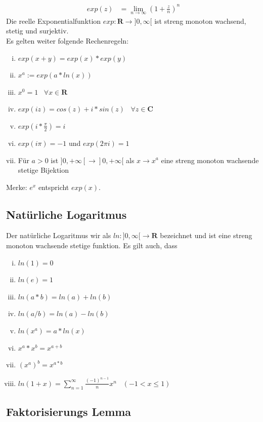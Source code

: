 \documentclass[8pt]{extarticle}
\begin{document}
\begin{multicols*}{3}
\begin{align*}
  exp(z) &= \lim_{n \rightarrow \infty} (1 + \frac{z}{n})^n
\end{align*}
Die reelle Exponentialfunktion $exp: \mathbf{R} \rightarrow ]0, \infty[$ ist streng monoton wachsend,
stetig und surjektiv.\\
Es gelten weiter folgende Rechenregeln:
\begin{enumerate}[(i)]
  \item $exp(x + y) = exp(x) * exp(y)$
  \item $x^a := exp(a * ln(x))$
  \item $x^0 = 1 \;\;\; \forall x \in \mathbf{R}$
  \item $exp(iz) = cos(z) + i*sin(z) \;\;\; \forall z \in \mathbf{C}$
  \item $exp(i*\frac{\pi}{2}) = i$
  \item $exp(i\pi) = -1$ und $exp(2\pi i) = 1$
  \item Für $a > 0$ ist $]0, +\infty[ \rightarrow ]0, +\infty[$ als $x \rightarrow x^a$ eine
  streng monoton wachsende stetige Bijektion
\end{enumerate}
Merke: $e^x$ entspricht $exp(x)$.

\subsection{Natürliche Logaritmus}

Der natürliche Logaritmus wir als $ln: ]0, \infty[ \rightarrow \mathbf{R}$ bezeichnet
und ist eine streng monoton wachsende stetige funktion. Es gilt auch, dass
\begin{enumerate}[(i)]
  \item $ln(1) = 0$
  \item $ln(e) = 1$
  \item $ln(a * b) = ln(a) + ln(b)$
  \item $ln(a / b) = ln(a) - ln(b)$
  \item $ln(x^a) = a * ln(x)$
  \item $x^a * x^b = x^{a + b}$
  \item $(x^a)^b = x^{a * b}$
  \item $ln(1+x) = \sum_{n=1}^{\infty} \frac{(-1)^{n-1}}{n} x^n \;\;\; (-1 < x \leq 1)$
\end{enumerate}

\subsection{Faktorisierungs Lemma}


\end{multicols*}
\end{document}
